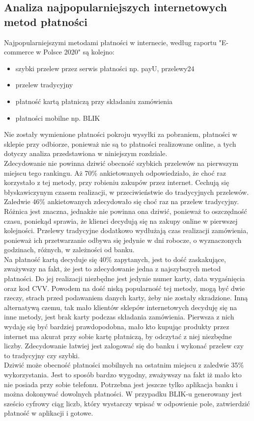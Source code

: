 \documentclass[12pt]{article}
\begin{document}
\begin{sloppypar}
{    \subsection{Analiza najpopularniejszych internetowych metod płatności} %
  {
    Najpopularniejszymi metodami płatności w internecie, według raportu "E-commerce w Polsce 2020"\cite{gemius-report} są kolejno:
    \begin{itemize}
      \item szybki przelew przez serwis płatności np. payU, przelewy24
      \item przelew tradycyjny
      \item płatność kartą płatniczą przy składaniu zamówienia
      \item płatności mobilne np. BLIK
    \end{itemize}
    Nie zostały wymienione płatności pokroju wysyłki za pobraniem, płatności w sklepie przy odbiorze, ponieważ nie są to płatności realizowane online, 
    a tych dotyczy analiza przedstawiona w niniejszym rozdziale.\\
    Zdecydowanie nie powinna dziwić obecność szybkich przelewów na pierwszym miejscu tego rankingu. Aż 70\% ankietowanych odpowiedziało, 
    że choć raz korzystało z tej metody, przy robieniu zakupów przez internet. Cechują się błyskawiczynym czasem realizacji, w przeciwieństwie do tradycyjnych
    przelewów. Zaledwie 46\% ankietowanych zdecydowało się choć raz na przelew tradycyjny. Różnica jest znaczna, jednakże nie powinna ona dziwić, ponieważ 
    to oszczędność czasu, poniekąd sprawia, że klienci decydują się na zakupy online w pierwszej kolejności. Przelewy tradycyjne dodatkowo wydłużają czas realizacji 
    zamówienia, ponieważ ich przetwarzanie odbywa się jedynie w dni robocze, o wyznaczonych godzinach, różnych, w zależności od banku.\\
    Na płatność kartą decyduje się 40\% zapytanych, jest to dość zaskakujące, zważywszy na fakt, że jest to zdecydowanie jedna z najszybszych metod płatności. 
    Do jej realizacji niezbędne jest jedynie numer karty, data wygaśnięcia oraz kod CVV. Powodem na dość niską popularność tej metody, mogą być dwie rzeczy, 
    strach przed podawaniem danych karty, żeby nie zostały skradzione. Inną alternatywą czemu, tak mało klientów sklepów internetowych decyduję się na inne metody, 
    jest brak karty podczas składania zamówienia. Pierwsza z nich wydaję się być bardziej prawdopodobna, mało kto kupując 
    produkty przez internet ma akurat przy sobie kartę płatniczą, by odczytać z niej niezbędne liczby. 
    Zdecydowanie łatwiej jest zalogować się do banku i wykonać przelew czy to tradycyjny czy szybki.\\
    Dziwić może obecność płatności mobilnych na ostatnim miejscu z zaledwie 35\% wykorzystania. Jest to sposób bardzo wygodny, zważywszy na fakt iż mało kto 
    nie posiada przy sobie telefonu. Potrzebna jest jeszcze tylko aplikacja banku i można dokonywać dowolnych płatności. W przypadku BLIK-u generowany jest sześcio 
    cyfrowy ciąg liczb, który wystarczy wpisać w odpowienie pole, zatwierdzić płatność w aplikacji i gotowe.
  }
}
\end{sloppypar}
\end{document}
